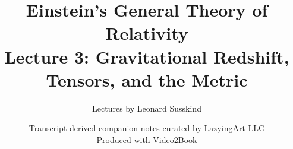 \documentclass[11pt,oneside]{book}
\begin{document}
\frontmatter
\hypersetup{pageanchor=false}
\title{Einstein's General Theory of Relativity\\[0.45em]
\large Lecture 3: Gravitational Redshift, Tensors, and the Metric}
\author{Lectures by Leonard Susskind}
\date{Transcript-derived companion notes curated by
\href{https://lazying.art}{LazyingArt LLC}\\[0.35em]
\small Produced with
\href{https://github.com/lachlanchen/Video2Book}{Video2Book}}
\maketitle
\hypersetup{pageanchor=true}
\clearpage
\mainmatter

\end{document}
